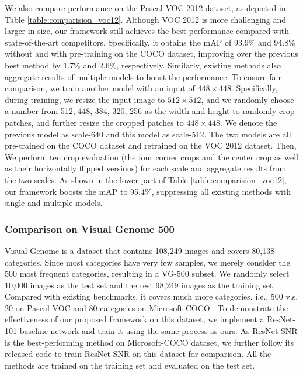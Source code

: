 \documentclass[10pt,twocolumn,letterpaper]{article}
\begin{document}
We also compare performance on the Pascal VOC 2012 dataset, as depicted in Table \ref{table:comparision_voc12}. Although VOC 2012 is more challenging and larger in size, our framework still achieves the best performance compared with state-of-the-art competitors. Specifically, it obtains the mAP of 93.9\% and 94.8\% without and with pre-training on the COCO dataset, improving over the previous best method by 1.7\% and 2.6\%, respectively. Similarly, existing methods also aggregate results of multiple models to boost the performance. To ensure fair comparison, we train another model with an input of $448 \times 448$. Specifically, during training, we resize the input image to $512 \times 512$, and we randomly choose a number from {512, 448, 384, 320, 256} as the width and height to randomly crop patches, and further resize the cropped patches to $448 \times 448$. We denote the previous model as scale-640 and this model as scale-512. The two models are all pre-trained on the COCO dataset and retrained on the VOC 2012 dataset. Then, We perform ten crop evaluation (the four corner crops and the center crop as well as their horizontally flipped versions) for each scale and aggregate results from the two scales. As shown in the lower part of Table \ref{table:comparision_voc12}, our framework boosts the mAP to 95.4\%, suppressing all existing methods with single and multiple models.

\subsubsection{Comparison on Visual Genome 500}
Visual Genome \cite{krishna2017visual} is a dataset that contains 108,249 images and covers 80,138 categories. Since most categories have very few samples, we merely consider the 500 most frequent categories, resulting in a VG-500 subset. We randomly select 10,000 images as the test set and the rest 98,249 images as the training set. Compared with existing benchmarks, it covers much more categories, i.e., 500 v.s. 20 on Pascal VOC \cite{everingham2010pascal} and 80 categories on Microsoft-COCO \cite{lin2014microsoft}. To demonstrate the effectiveness of our proposed framework on this dataset, we implement a ResNet-101 baseline network and train it using the same process as ours. As ResNet-SNR \cite{zhu2017learning} is the best-performing method on Microsoft-COCO dataset, we further follow its released code to train ResNet-SNR on this dataset for comparison. All the methods are trained on the training set and evaluated on the test set.
\end{document}
